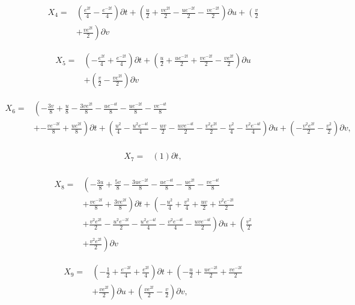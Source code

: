 \begin{align*}
X_{4}=&\left(\frac{e^{2 t}}{4} - \frac{e^{- 2 t}}{4} \right)\partial t+\left(\frac{u}{2}+\frac{v e^{2 t}}{2}- \frac{u e^{- 2 t}}{2}- \frac{v e^{- 2 t}}{2} \right)\partial u+\left(\frac{v}{2}\right.\\
&+\left.\frac{v e^{2 t}}{2} \right)\partial v
\end{align*}

\begin{align*}
X_{5}=&\left(- \frac{e^{2 t}}{4}+\frac{e^{- 2 t}}{4} \right)\partial t+\left(\frac{u}{2}+\frac{u e^{- 2 t}}{2}+\frac{v e^{- 2 t}}{2}- \frac{v e^{2 t}}{2} \right)\partial u\\
&+\left(\frac{v}{2}- \frac{v e^{2 t}}{2} \right)\partial v
\end{align*}

\begin{align*}
X_{6}=&\left(- \frac{3 v}{8}+\frac{u}{8}- \frac{3 v e^{2 t}}{8}- \frac{u e^{- 4 t}}{8}- \frac{u e^{- 2 t}}{8}- \frac{v e^{- 4 t}}{8}\right.\\
&+\left.- \frac{v e^{- 2 t}}{8}+\frac{u e^{2 t}}{8} \right)\partial t+\left(\frac{u^{2}}{4} - \frac{u^{2} e^{- 4 t}}{4} - \frac{u v}{2} - \frac{u v e^{- 4 t}}{2} - \frac{v^{2} e^{2 t}}{2} - \frac{v^{2}}{4} - \frac{v^{2} e^{- 4 t}}{4} \right)\partial u+\left(- \frac{v^{2} e^{2 t}}{2} - \frac{v^{2}}{2} \right)\partial v,\\
\end{align*}

\begin{align*}
X_{7}=&\left(1 \right)\partial t,\\
\end{align*}

\begin{align*}
X_{8}=&\left(- \frac{3 u}{8}+\frac{5 v}{8}- \frac{3 u e^{- 2 t}}{8}- \frac{u e^{- 4 t}}{8}- \frac{u e^{2 t}}{8}- \frac{v e^{- 4 t}}{8}\right.\\
&+\left.\frac{v e^{- 2 t}}{8}+\frac{3 v e^{2 t}}{8} \right)\partial t+\left(- \frac{u^{2}}{4}+\frac{v^{2}}{4}+\frac{u v}{2}+\frac{v^{2} e^{- 2 t}}{2}\right.\\
&+\left.\frac{v^{2} e^{2 t}}{2}- \frac{u^{2} e^{- 2 t}}{2}- \frac{u^{2} e^{- 4 t}}{4}- \frac{v^{2} e^{- 4 t}}{4}- \frac{u v e^{- 4 t}}{2} \right)\partial u+\left(\frac{v^{2}}{2}\right.\\
&+\left.\frac{v^{2} e^{2 t}}{2} \right)\partial v
\end{align*}

\begin{align*}
X_{9}=&\left(- \frac{1}{2}+\frac{e^{- 2 t}}{4}+\frac{e^{2 t}}{4} \right)\partial t+\left(- \frac{u}{2}+\frac{u e^{- 2 t}}{2}+\frac{v e^{- 2 t}}{2}\right.\\
&+\left.\frac{v e^{2 t}}{2} \right)\partial u+\left(\frac{v e^{2 t}}{2} - \frac{v}{2} \right)\partial v,\\
\end{align*}

